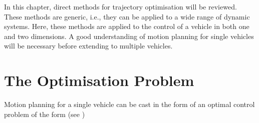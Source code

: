 %
\cleardoublepage%
\label{chap:theory}

\par In this chapter, direct methods for trajectory optimisation will be reviewed. These methods are generic, i.e., they can be applied to a wide range of dynamic systems. Here, these methods are applied to the control of a vehicle in both one and two dimensions. A good understanding of motion planning for single vehicles will be necessary before extending to multiple vehicles.

\section{The Optimisation Problem}
\label{sec:optimprob_intro}

\par Motion planning for a single vehicle can be cast in the form of an optimal control problem of the form (see \cite{diehl2006fast})

